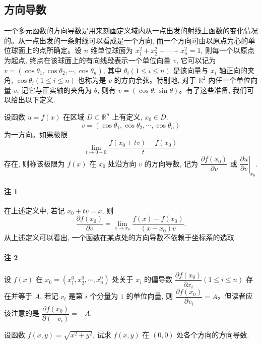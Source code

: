 \subsection{方向导数}
\label{subsec:ma-14-1-2}

一个多元函数的方向导数是用来刻画定义域内从一点出发的射线上函数的变化情况的。从一点出发的一条射线可以看成是一个方向, 而一个方向可由以原点为心的单位球面上的点所确定。设 $n$ 维单位球面为 $x_1^2+x_2^2+\cdots+x_n^2=1$, 则每一个以原点为起点, 终点在该球面上的有向线段表示一个单位向量 $v$, 它可以记为 $v=(\cos\theta_1,\cos\theta_2,\cdots,\cos\theta_n)$, 其中 $\theta_i(1\leqslant i\leqslant n)$ 是该向量与 $x_i$ 轴正向的夹角, $\cos\theta_i(1\leqslant i\leqslant n)$ 也称为是 $v$ 的方向余弦。特别地, 对于 $\mathbb R^2$ 内任一个单位向量 $v$, 记它与正实轴的夹角为 $\theta$, 则有 $v=(\cos\theta,\sin\theta)$。有了这些准备, 我们可以给出以下定义.

\begin{definition}\label{definition:ma-14-1-2}
设函数 $u=f(x)$ 在区域 $D\subset\mathbb R^n$ 上有定义, $x_0\in D$,
\[
  v=(\cos\theta_1,\cos\theta_2,\cdots,\cos\theta_n)
\]
为一方向。如果极限
\[
  \lim_{t\to0+0}\frac{f(x_0+tv)-f(x_0)}{t}
\]
存在, 则称该极限为 $f(x)$ 在 $x_0$ 处沿方向 $v$ 的方向导数, 记为 $\dfrac{\partial f(x_0)}{\partial v}$ 或 $\left.\dfrac{\partial u}{\partial v}\right|_{x_0}$.
\end{definition}


\paragraph*{注 1}
在上述定义中, 若记 $x_0+tv=x$, 则
\[
  \frac{\partial f(x_0)}{\partial v}
  =\lim_{x\to x_0}\frac{f(x)-f(x_0)}{(x-x_0)v}.
\]
从上述定义可以看出, 一个函数在某点处的方向导数不依赖于坐标系的选取.

\paragraph*{注 2}
设 $f(x)$ 在 $x_0=(x_1^0,x_2^0,\cdots,x_n^0)$ 处关于 $x_i$ 的偏导数 $\dfrac{\partial f(x_0)}{\partial x_i}(1\leqslant i\leqslant n)$ 存在并等于 $A$, 若记 $v_i$ 是第 $i$ 个分量为 $1$ 的单位向量, 则 $\dfrac{\partial f(x_0)}{\partial v_i}=A$。但读者应该注意的是 $\dfrac{\partial f(x_0)}{\partial(-v_i)}=-A$.

\begin{example}\label{example:ma-14-1-3}
设函数 $f(x,y)=\sqrt{x^2+y^2}$, 试求 $f(x,y)$ 在 $(0,0)$ 处各个方向的方向导数.
\end{example}


